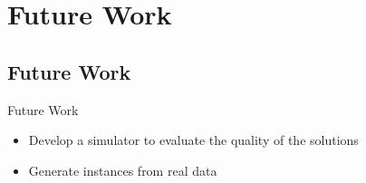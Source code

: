 


\section{Future Work}
\subsection{Future Work}
\begin{frame}{Future Work}
  \begin{itemize}
  \item Develop a simulator to evaluate the quality of the solutions
  \item Generate instances from real data
  \end{itemize}
\end{frame}

